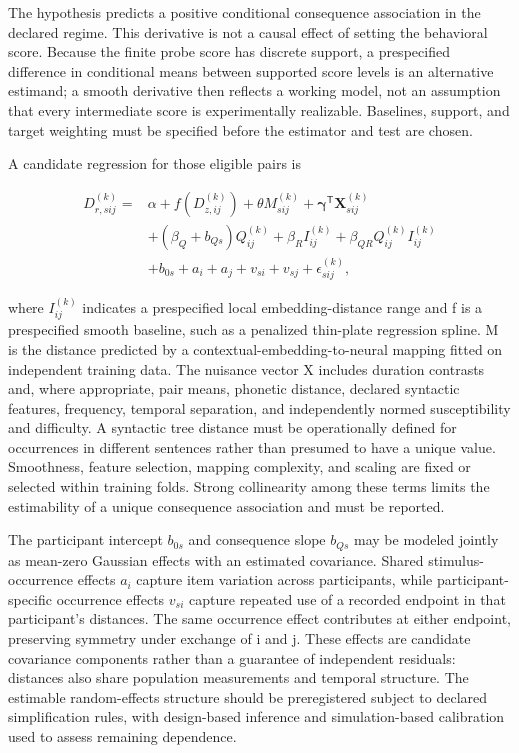 \documentclass[11pt]{article}
\begin{document}
The hypothesis predicts a positive conditional consequence association
in the declared regime. This derivative is not a causal effect of
setting the behavioral score. Because the finite probe score has
discrete support, a prespecified difference in conditional means between
supported score levels is an alternative estimand; a smooth derivative
then reflects a working model, not an assumption that every intermediate
score is experimentally realizable. Baselines, support, and target
weighting must be specified before the estimator and test are chosen.

A candidate regression for those eligible pairs is

\begin{equation}
\begin{aligned}
D_{r,sij}^{(k)}={}&\alpha+f(D_{z,ij}^{(k)})
+\theta M_{sij}^{(k)}+\boldsymbol\gamma^{\mathsf T}\mathbf X_{sij}^{(k)}\\
&+(\beta_Q+b_{Qs})Q_{ij}^{(k)}
+\beta_R I_{ij}^{(k)}
+\beta_{QR}Q_{ij}^{(k)}I_{ij}^{(k)}\\
&+b_{0s}+a_i+a_j+v_{si}+v_{sj}+\epsilon_{sij}^{(k)},
\end{aligned}
\end{equation}

where \(I_{ij}^{(k)}\) indicates a prespecified local embedding-distance
range and f is a prespecified smooth baseline, such as a penalized
thin-plate regression spline. M is the distance predicted by a
contextual-embedding-to-neural mapping fitted on independent training
data. The nuisance vector X includes duration contrasts and, where
appropriate, pair means, phonetic distance, declared syntactic features,
frequency, temporal separation, and independently normed susceptibility
and difficulty. A syntactic tree distance must be operationally defined
for occurrences in different sentences rather than presumed to have a
unique value. Smoothness, feature selection, mapping complexity, and
scaling are fixed or selected within training folds. Strong collinearity
among these terms limits the estimability of a unique consequence
association and must be reported.

The participant intercept \(b_{0s}\) and consequence slope \(b_{Qs}\)
may be modeled jointly as mean-zero Gaussian effects with an estimated
covariance. Shared stimulus-occurrence effects \(a_i\) capture item
variation across participants, while participant-specific occurrence
effects \(v_{si}\) capture repeated use of a recorded endpoint in that
participant's distances. The same occurrence effect contributes at
either endpoint, preserving symmetry under exchange of i and j. These
effects are candidate covariance components rather than a guarantee of
independent residuals: distances also share population measurements and
temporal structure. The estimable random-effects structure should be
preregistered subject to declared simplification rules, with
design-based inference and simulation-based calibration used to assess
remaining dependence.
\end{document}
